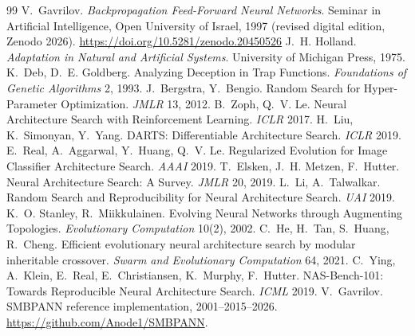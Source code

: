\documentclass[11pt]{article}
\begin{document}
\begin{thebibliography}{99}
\small
{} V.~Gavrilov. \emph{Backpropagation Feed-Forward Neural Networks}.
  Seminar in Artificial Intelligence, Open University of Israel, 1997 (revised digital
  edition, Zenodo 2026). \url{https://doi.org/10.5281/zenodo.20450526}
 J.~H. Holland. \emph{Adaptation in Natural and Artificial Systems}.
  University of Michigan Press, 1975.
 K.~Deb, D.~E. Goldberg. Analyzing Deception in Trap Functions.
  \emph{Foundations of Genetic Algorithms} 2, 1993.
 J.~Bergstra, Y.~Bengio. Random Search for Hyper-Parameter
  Optimization. \emph{JMLR} 13, 2012.
 B.~Zoph, Q.~V. Le. Neural Architecture Search with Reinforcement
  Learning. \emph{ICLR} 2017.
 H.~Liu, K.~Simonyan, Y.~Yang. DARTS: Differentiable Architecture
  Search. \emph{ICLR} 2019.
 E.~Real, A.~Aggarwal, Y.~Huang, Q.~V. Le. Regularized Evolution for
  Image Classifier Architecture Search. \emph{AAAI} 2019.
 T.~Elsken, J.~H. Metzen, F.~Hutter. Neural Architecture Search: A
  Survey. \emph{JMLR} 20, 2019.
 L.~Li, A.~Talwalkar. Random Search and Reproducibility for Neural
  Architecture Search. \emph{UAI} 2019.
 K.~O. Stanley, R.~Miikkulainen. Evolving Neural Networks through
  Augmenting Topologies. \emph{Evolutionary Computation} 10(2), 2002.
 C.~He, H.~Tan, S.~Huang, R.~Cheng. Efficient evolutionary neural
  architecture search by modular inheritable crossover. \emph{Swarm and Evolutionary
  Computation} 64, 2021.
 C.~Ying, A.~Klein, E.~Real, E.~Christiansen, K.~Murphy, F.~Hutter.
  NAS-Bench-101: Towards Reproducible Neural Architecture Search. \emph{ICML} 2019.
 V.~Gavrilov. SMBPANN reference implementation, 2001--2015--2026.
  \url{https://github.com/Anode1/SMBPANN}.
\end{thebibliography}
\end{document}
